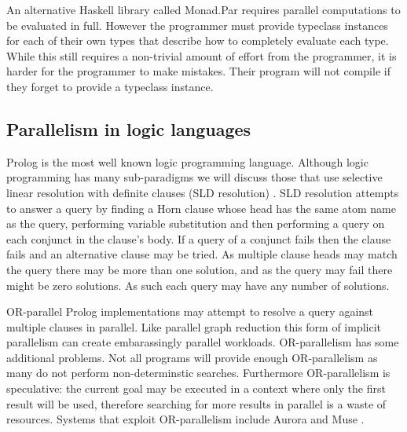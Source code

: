An alternative Haskell library called Monad.Par \citep{marlow:monadpar}
requires parallel computations to be evaluated in full.
However the programmer must provide typeclass instances for each of their
own types that describe how to completely evaluate each type.
While this still requires a non-trivial amount of effort from the
programmer,
it is harder for the programmer to make mistakes.
Their program will not compile if they forget to provide a typeclass
instance.

\subsection{Parallelism in logic languages}
\label{sec:intro_par_logic}

Prolog is the most well known logic programming language.
Although logic programming has many sub-paradigms we will discuss
those that use selective linear resolution with definite clauses
(SLD resolution) \citep{kowalski_sld}.
SLD resolution attempts to answer a query by finding a Horn clause whose
head has the same atom name as the query,
performing variable substitution and then performing a query on each
conjunct in the clause's body.
If a query of a conjunct fails then the clause fails and an alternative
clause may be tried.
As multiple clause heads may match the query there may be more than one
solution,
and as the query may fail there might be zero solutions.
As such each query may have any number of solutions.

OR-parallel Prolog implementations may attempt to resolve a query against
multiple clauses in parallel.
Like parallel graph reduction this form of implicit parallelism can create
embarassingly parallel workloads.
OR-parallelism has some additional problems.
Not all programs will provide enough OR-parallelism as many do not perform
non-determinstic searches.
Furthermore OR-parallelism is speculative:
the current goal may be executed in a context where only the first result
will be used,
therefore searching for more results in parallel is a waste of resources.
Systems that exploit OR-parallelism include
Aurora \citep{lusk:1990:aurora}
and Muse \citep{ali:1990:muse}.

